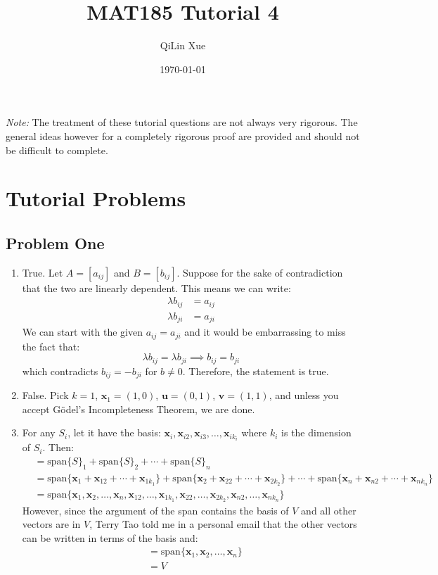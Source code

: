 \documentclass{article}
\title{MAT185 Tutorial 4}
\author{QiLin Xue}
\date{\today}
\newcommand{\spann}[1]{\mathrm{span}\{#1\}}
\begin{document}
\maketitle
\textit{Note:} The treatment of these tutorial questions are not always very rigorous. The general ideas however for a completely rigorous proof are provided and should not be difficult to complete.
\section{Tutorial Problems}
\subsection*{Problem One}
\begin{enumerate}[label=(\alph*)]
    \item True. Let $A = [a_{ij}]$ and $B = [b_{ij}]$. Suppose for the sake of contradiction that the two are linearly dependent. This means we can write:
    \begin{align}
        \lambda b_{ij} &=  a_{ij} \\ 
        \lambda b_{ji} &=  a_{ji}
    \end{align}
    We can start with the given $a_{ij} = a_{ji}$ and it would be embarrassing to miss the fact that:
    \begin{equation}
        \lambda b_{ij} = \lambda b_{ji} \implies b_{ij}=b_{ji}
    \end{equation}
    which contradicts $b_{ij}=-b_{ji}$ for $b \neq 0$. Therefore, the statement is true.
    \item False. Pick $k=1$, $\bm{x}_1=(1,0)$, $\bm{u}=(0,1)$, $\bm{v} = (1,1)$, and unless you accept Gödel’s Incompleteness Theorem, we are done. 
    \item For any $S_i$, let it have the basis: $\bm{x}_i, \bm{x}_{i2}, \bm{x}_{i3}, \dots, \bm{x}_{ik_i}$ where $k_i$ is the dimension of $S_i$. Then:
    \begin{align}
          &= \spann S_1 + \spann S_2 + \cdots + \spann S_n \\ 
          &= \spann{\bm{x}_1 + \bm{x}_{12} + \cdots + \bm{x}_{1k_1}} + \spann{\bm{x}_2 + \bm{x}_{22} + \cdots + \bm{x}_{2k_2}} + \cdots + \spann{\bm{x}_n + \bm{x}_{n2} + \cdots + \bm{x}_{nk_n}} \\ 
          &= \spann{\bm{x}_1, \bm{x}_2, \dots,\bm{x}_n, \bm{x}_{12}, \dots, \bm{x}_{1k_1}, \bm{x}_{22}, \dots, \bm{x}_{2k_2}, \bm{x}_{n2}, \dots , \bm{x}_{nk_n}}
    \end{align}
    However, since the argument of the span contains the basis of $V$ and all other vectors are in $V$, Terry Tao told me in a personal email that the other vectors can be written in terms of the basis and:
    \begin{align}
        &= \spann{\bm{x}_1, \bm{x}_2, \dots,\bm{x}_n} \\ 
        &= V
    \end{align}
\end{enumerate}
\end{document}
